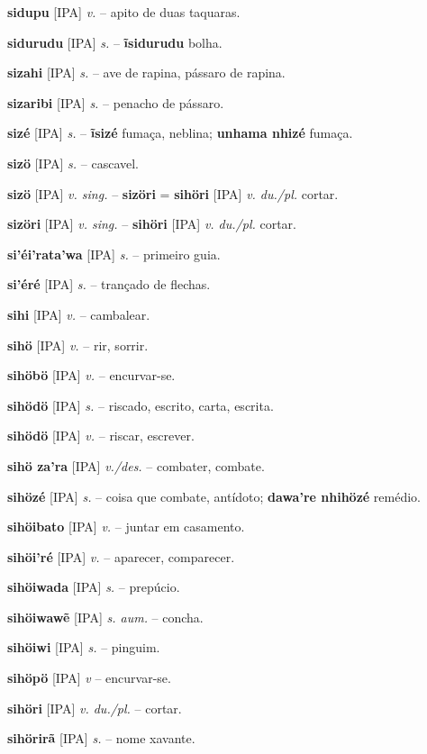 \textbf{sidupu} [IPA] \textit{v.} -- apito de duas taquaras.

\textbf{sidurudu} [IPA] \textit{s.} -- \textbf{ĩsidurudu} bolha.

\textbf{sizahi} [IPA] \textit{s.} -- ave de rapina, pássaro de rapina.

\textbf{sizaribi} [IPA] \textit{s.} -- penacho de pássaro.

\textbf{sizé} [IPA] \textit{s.} -- \textbf{ĩsizé} fumaça, neblina; \textbf{unhama nhizé} fumaça.

\textbf{sizö} [IPA] \textit{s.} -- cascavel.

\textbf{sizö} [IPA] \textit{v. sing.} -- \textbf{sizöri} = \textbf{sihöri} [IPA] \textit{v. du./pl.} cortar.

\textbf{sizöri} [IPA] \textit{v. sing.} -- \textbf{sihöri} [IPA] \textit{v. du./pl.} cortar.

\textbf{si'éi'rata'wa} [IPA] \textit{s.} -- primeiro guia.

\textbf{si'éré} [IPA] \textit{s.} -- trançado de flechas.

\textbf{sihi} [IPA] \textit{v.} -- cambalear.

\textbf{sihö} [IPA] \textit{v.} -- rir, sorrir.

\textbf{sihöbö} [IPA] \textit{v.} -- encurvar-se.

\textbf{sihödö} [IPA] \textit{s.} -- riscado, escrito, carta, escrita.

\textbf{sihödö} [IPA] \textit{v.} -- riscar, escrever.

\textbf{sihö za'ra} [IPA] \textit{v./des.} -- combater, combate.

\textbf{sihözé} [IPA] \textit{s.} -- coisa que combate, antídoto; \textbf{dawa're nhihözé} remédio.

\textbf{sihöibato} [IPA] \textit{v.} -- juntar em casamento.

\textbf{sihöi'ré} [IPA] \textit{v.} -- aparecer, comparecer.

\textbf{sihöiwada} [IPA] \textit{s.} -- prepúcio.

\textbf{sihöiwawẽ} [IPA] \textit{s. aum.} -- concha.

\textbf{sihöiwi} [IPA] \textit{s.} -- pinguim.

\textbf{sihöpö} [IPA] \textit{v} -- encurvar-se.

\textbf{sihöri} [IPA] \textit{v. du./pl.} -- cortar.

\textbf{sihörirã} [IPA] \textit{s.} -- nome xavante.

